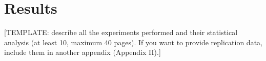 \chapter{Results}

[TEMPLATE: describe all the experiments performed and their statistical analysis (at least 10, maximum 40 pages). If you want to provide replication data, include them in another appendix (Appendix II).]